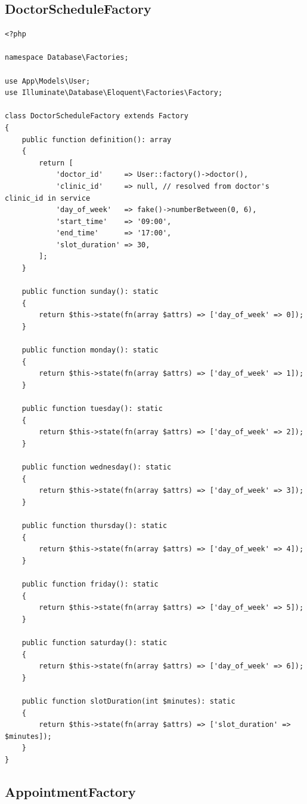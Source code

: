 \subsection{DoctorScheduleFactory}

\begin{lstlisting}[style=php, caption={\texttt{database/factories/DoctorScheduleFactory.php}
  --- Day-of-week state methods for readable schedule setup.}]
<?php

namespace Database\Factories;

use App\Models\User;
use Illuminate\Database\Eloquent\Factories\Factory;

class DoctorScheduleFactory extends Factory
{
    public function definition(): array
    {
        return [
            'doctor_id'     => User::factory()->doctor(),
            'clinic_id'     => null, // resolved from doctor's clinic_id in service
            'day_of_week'   => fake()->numberBetween(0, 6),
            'start_time'    => '09:00',
            'end_time'      => '17:00',
            'slot_duration' => 30,
        ];
    }

    public function sunday(): static
    {
        return $this->state(fn(array $attrs) => ['day_of_week' => 0]);
    }

    public function monday(): static
    {
        return $this->state(fn(array $attrs) => ['day_of_week' => 1]);
    }

    public function tuesday(): static
    {
        return $this->state(fn(array $attrs) => ['day_of_week' => 2]);
    }

    public function wednesday(): static
    {
        return $this->state(fn(array $attrs) => ['day_of_week' => 3]);
    }

    public function thursday(): static
    {
        return $this->state(fn(array $attrs) => ['day_of_week' => 4]);
    }

    public function friday(): static
    {
        return $this->state(fn(array $attrs) => ['day_of_week' => 5]);
    }

    public function saturday(): static
    {
        return $this->state(fn(array $attrs) => ['day_of_week' => 6]);
    }

    public function slotDuration(int $minutes): static
    {
        return $this->state(fn(array $attrs) => ['slot_duration' => $minutes]);
    }
}
\end{lstlisting}

\subsection{AppointmentFactory}

